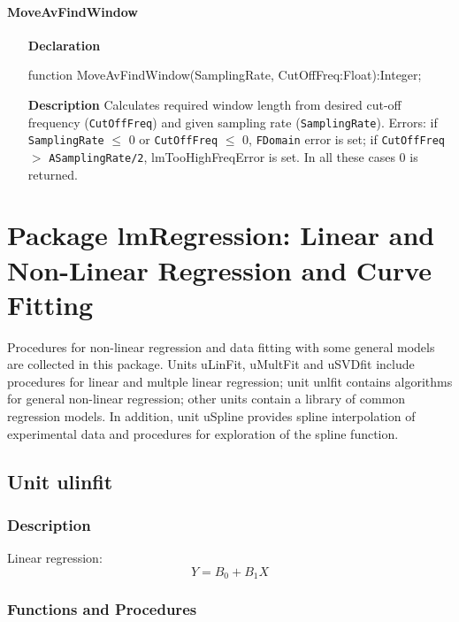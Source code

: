 \documentclass[12pt,a4paper,oneside]{report}
\newcommand{\declarationitem}[1]{\textbf{#1}}
\newcommand{\descriptiontitle}[1]{\textbf{#1}}
\newcommand{\code}[1]{\texttt{#1}}
\begin{document}
\subsubsection{MoveAvFindWindow}
\label{ufilters-moveavfindwindow}
\begin{itemize}
	\item[\declarationitem{Declaration}\hfill]
	\begin{flushleft}
function MoveAvFindWindow(SamplingRate, CutOffFreq:Float):Integer;		
	\end{flushleft}
	\item[\descriptiontitle{Description}]
	Calculates required window length from desired cut-off frequency (\code{CutOffFreq}) and given sampling rate (\code{SamplingRate}). Errors: if \code{SamplingRate} $\leq$ 0 or \code{CutOffFreq} $\leq$ 0, \code{FDomain} error is set; if \code{CutOffFreq} $>$ \code{ASamplingRate/2}, lmTooHighFreqError is set. In all these cases 0 is returned. 
\end{itemize}	

\chapter[Package lmRegression]{Package lmRegression: Linear and Non-Linear Regression and Curve Fitting}\label{package-lmRegression}
Procedures for non-linear regression and data fitting with some general models are collected in this package. Units uLinFit, uMultFit and uSVDfit include procedures for linear and multple linear regression; unit unlfit contains algorithms for general non-linear regression; other units contain a library of common regression models. In addition, unit uSpline provides spline interpolation of experimental data and procedures for exploration of the spline function. 


\section{Unit ulinfit}
\label{ulinfit}
\subsection{Description}
Linear regression:
$$Y = B_0 + B_1X$$ 
\subsection{Functions and Procedures}
\end{document}
